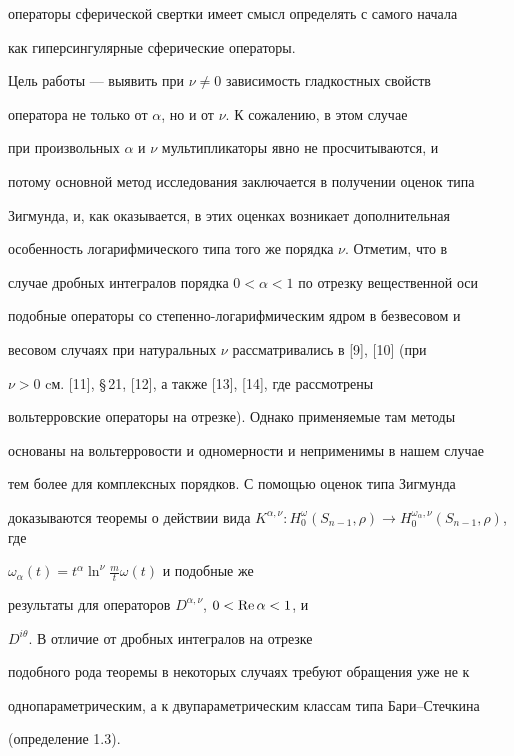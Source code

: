 операторы сферической свертки имеет смысл определять с самого начала


как гиперсингулярные сферические операторы.





Цель работы --- выявить при $\nu\ne 0$ зависимость гладкостных свойств


оператора не только от $\alpha$, но и от $\nu$. К сожалению, в этом случае


при произвольных $\alpha$ и $\nu$ мультипликаторы явно не просчитываются, и


потому основной метод исследования заключается в получении оценок типа


Зигмунда, и, как оказывается, в этих оценках возникает дополнительная


особенность логарифмического типа того же порядка $\nu$. Отметим, что в


случае дробных интегралов порядка $0<\alpha<1$ по отрезку вещественной оси


подобные операторы со степенно-логарифмическим ядром в безвесовом и


весовом случаях при натуральных $\nu$ рассматривались в [9], [10] (при


$\nu>0$ cм. [11], \S\,21, [12], а также [13], [14], где рассмотрены


вольтерровские операторы на отрезке). Однако применяемые там методы


основаны на вольтерровости и одномерности и неприменимы в нашем случае 


тем более для комплексных порядков. С помощью оценок типа Зигмунда


доказываются теоремы о действии вида $K^{\alpha,\nu}: H_0^\omega (S_{n-


1},\rho) \to H_0^{\omega _\alpha,\nu}(S_{n-1},\rho)$, где


$\omega_\alpha(t) = t^\alpha \ln^\nu \frac{m}{t} \omega(t)$ и подобные же


результаты для операторов $D^{\alpha,\nu}$, $0 < \operatorname{Re} \alpha < 1$, и


$D^{i\theta}$. В отличие от дробных интегралов на отрезке


подобного рода теоремы в некоторых случаях требуют обращения уже не к


однопараметрическим, а к двупараметрическим классам типа Бари--Стечкина


(определение 1.3).





